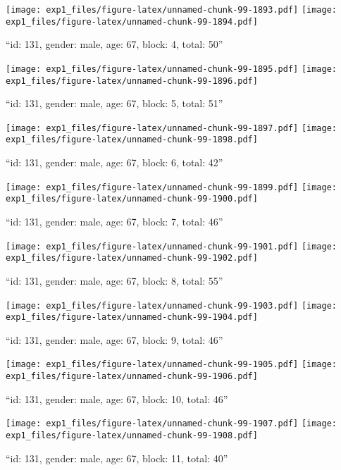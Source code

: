 \documentclass[,]{article}
\begin{document}
\texttt{[image: exp1\_files/figure-latex/unnamed-chunk-99-1893.pdf]}
\texttt{[image: exp1\_files/figure-latex/unnamed-chunk-99-1894.pdf]}

\newpage
[1] 

``id: 131, gender: male, age: 67, block: 4, total: 50''

\texttt{[image: exp1\_files/figure-latex/unnamed-chunk-99-1895.pdf]}
\texttt{[image: exp1\_files/figure-latex/unnamed-chunk-99-1896.pdf]}

\newpage
[1] 

``id: 131, gender: male, age: 67, block: 5, total: 51''

\texttt{[image: exp1\_files/figure-latex/unnamed-chunk-99-1897.pdf]}
\texttt{[image: exp1\_files/figure-latex/unnamed-chunk-99-1898.pdf]}

\newpage
[1] 

``id: 131, gender: male, age: 67, block: 6, total: 42''

\texttt{[image: exp1\_files/figure-latex/unnamed-chunk-99-1899.pdf]}
\texttt{[image: exp1\_files/figure-latex/unnamed-chunk-99-1900.pdf]}

\newpage
[1] 

``id: 131, gender: male, age: 67, block: 7, total: 46''

\texttt{[image: exp1\_files/figure-latex/unnamed-chunk-99-1901.pdf]}
\texttt{[image: exp1\_files/figure-latex/unnamed-chunk-99-1902.pdf]}

\newpage
[1] 

``id: 131, gender: male, age: 67, block: 8, total: 55''

\texttt{[image: exp1\_files/figure-latex/unnamed-chunk-99-1903.pdf]}
\texttt{[image: exp1\_files/figure-latex/unnamed-chunk-99-1904.pdf]}

\newpage
[1] 

``id: 131, gender: male, age: 67, block: 9, total: 46''

\texttt{[image: exp1\_files/figure-latex/unnamed-chunk-99-1905.pdf]}
\texttt{[image: exp1\_files/figure-latex/unnamed-chunk-99-1906.pdf]}

\newpage
[1] 

``id: 131, gender: male, age: 67, block: 10, total: 46''

\texttt{[image: exp1\_files/figure-latex/unnamed-chunk-99-1907.pdf]}
\texttt{[image: exp1\_files/figure-latex/unnamed-chunk-99-1908.pdf]}

\newpage
[1] 

``id: 131, gender: male, age: 67, block: 11, total: 40''
\end{document}
